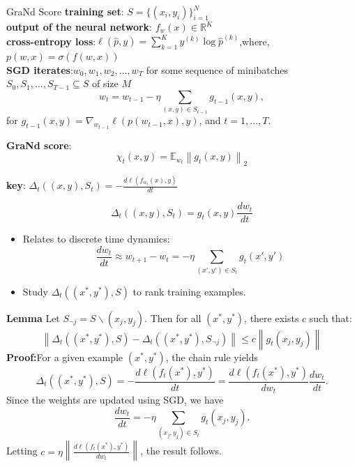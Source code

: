 \documentclass{ctexbeamer}
\begin{document}
\begin{frame}[allowframebreaks]{GraNd Score}
\textbf{training set}: \( S = \{(x_i, y_i)\}_{i=1}^N \) \\ 
\textbf{output of the neural network}: \( f_w(x) \in \mathbb{R}^K \) \\
\textbf{cross-entropy loss}:\(
\ell(\hat{p}, y) = \sum_{k=1}^K y^{(k)} \log \hat{p}^{(k)}
\),where,\( p(w, x) = \sigma(f(w, x)) \)\\


\textbf{SGD iterates}:\( w_0, w_1, w_2, \ldots, w_T \)  for some sequence of minibatches \( S_0, S_1, \ldots, S_{T-1} \subseteq S \) of size \( M \)
\[
w_t = w_{t-1} - \eta \sum_{(x,y) \in S_{t-1}} g_{t-1}(x, y), 
\]
for \( g_{t-1}(x, y) = \nabla_{w_{t-1}} \ell(p(w_{t-1}, x), y) \), and \( t = 1, \ldots, T \).
    
\textbf{ GraNd score}:
\[
\chi_{t}(x, y) = \mathbb{E}_{w_{t}}\left\|g_{t}(x, y)\right\|_{2}
\]

\textbf{key}:
    $
    \Delta_{t}((x, y), S_{t}) = -\frac{d\ell(f_{w_{t}}(x), y)}{dt}
    $

\[
\Delta_{t}((x, y), S_{t}) = g_{t}(x, y) \frac{d w_{t}}{dt}
\]

\begin{itemize}
    \item Relates to discrete time dynamics:
    \[
    \frac{d w_{t}}{dt} \approx w_{t+1} - w_{t} = -\eta \sum_{(x', y') \in S_{t}} g_{t}(x', y')
    \]
    \item Study \( \Delta_{t}((x^{*}, y^{*}), S) \) to rank training examples.
\end{itemize}
\textbf{Lemma} Let \( S_{\neg j} = S \backslash (x_{j}, y_{j}) \). Then for all \( (x^{*}, y^{*}) \), there exists \( c \) such that:
\[
\left\|\Delta_{t}((x^{*}, y^{*}), S) - \Delta_{t}((x^{*}, y^{*}), S_{\neg j})\right\| \leq c \left\|g_{t}(x_{j}, y_{j})\right\|
\]
\scriptsize
\textbf{Proof:}For a given example \((x^*, y^*)\), the chain rule yields
\[
\Delta_t((x^*, y^*), S) = -\frac{d\ell(f_t(x^*), y^*)}{dt} = \frac{d\ell(f_t(x^*), y^*)}{dw_t} \frac{dw_t}{dt}.
\]
Since the weights are updated using SGD, we have
\[
\frac{dw_t}{dt} = -\eta \sum_{(x_j, y_j) \in S_t} g_t(x_j, y_j).
\]
Letting \( c = \eta \left\| \frac{d\ell(f_t(x^*), y^*)}{dw_t} \right\| \), the result follows.
\end{frame}
\end{document}
